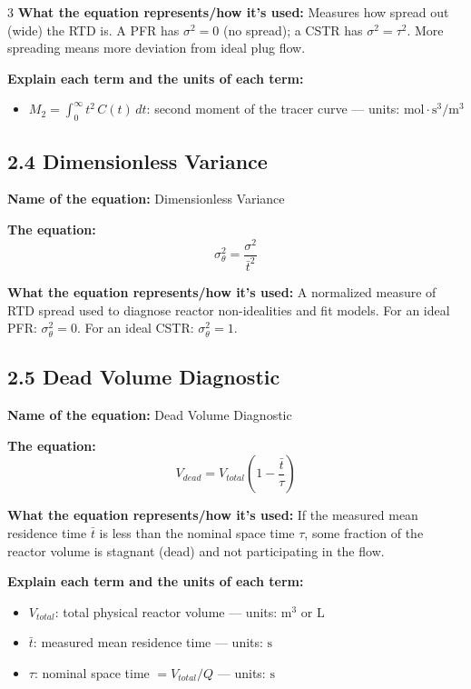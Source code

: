\documentclass[8pt]{extarticle}
\begin{document}
\begin{multicols*}{3}
\textbf{What the equation represents/how it's used:} Measures how spread out (wide) the RTD is. A PFR has \(\sigma^2=0\) (no spread); a CSTR has \(\sigma^2=\tau^2\). More spreading means more deviation from ideal plug flow.

\textbf{Explain each term and the units of each term:}
\begin{itemize}
\item \(M_2=\int_0^\infty t^2\,C(t)\,dt\): second moment of the tracer curve --- units: \(\mathrm{mol\cdot s^3/m^3}\)
\end{itemize}

\subsection*{2.4 Dimensionless Variance}

\textbf{Name of the equation:} Dimensionless Variance

\textbf{The equation:}
\[
\sigma_\theta^2=\frac{\sigma^2}{\bar{t}^2}
\]

\textbf{What the equation represents/how it's used:} A normalized measure of RTD spread used to diagnose reactor non-idealities and fit models. For an ideal PFR: \(\sigma_\theta^2=0\). For an ideal CSTR: \(\sigma_\theta^2=1\).

\subsection*{2.5 Dead Volume Diagnostic}

\textbf{Name of the equation:} Dead Volume Diagnostic

\textbf{The equation:}
\[
V_{dead}=V_{total}\left(1-\frac{\bar{t}}{\tau}\right)
\]

\textbf{What the equation represents/how it's used:} If the measured mean residence time \(\bar{t}\) is less than the nominal space time \(\tau\), some fraction of the reactor volume is stagnant (dead) and not participating in the flow.

\textbf{Explain each term and the units of each term:}
\begin{itemize}
\item \(V_{total}\): total physical reactor volume --- units: \(\mathrm{m^3}\) or \(\mathrm{L}\)
\item \(\bar{t}\): measured mean residence time --- units: \(\mathrm{s}\)
\item \(\tau\): nominal space time \(=V_{total}/Q\) --- units: \(\mathrm{s}\)
\end{itemize}


\end{multicols*}
\end{document}
